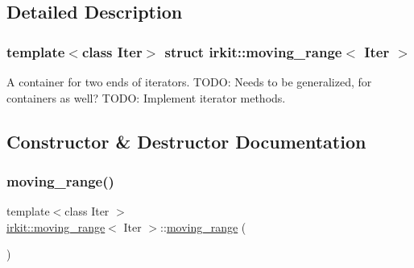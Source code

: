 \subsection{Detailed Description}
\subsubsection*{template$<$class Iter$>$\newline
struct irkit\+::moving\+\_\+range$<$ Iter $>$}

A container for two ends of iterators. T\+O\+DO\+: Needs to be generalized, for containers as well? T\+O\+DO\+: Implement iterator methods. 

\subsection{Constructor \& Destructor Documentation}
\mbox{\label{structirkit_1_1moving__range_a9b6d474c670875034ca5a044b0a2fc14}} 
\subsubsection{\texorpdfstring{moving\+\_\+range()}{moving\_range()}\hspace{0.1cm}{\footnotesize\ttfamily [1/2]}}
{\footnotesize\ttfamily template$<$class Iter $>$ \\
\hyperlink{structirkit_1_1moving__range}{irkit\+::moving\+\_\+range}$<$ Iter $>$\+::\hyperlink{structirkit_1_1moving__range}{moving\+\_\+range} (\begin{DoxyParamCaption}{ }\end{DoxyParamCaption})\hspace{0.3cm}{\ttfamily [default]}}

\mbox{\label{structirkit_1_1moving__range_a79a261cc6e7da7ffb0d93a198fe3dab7}} 
